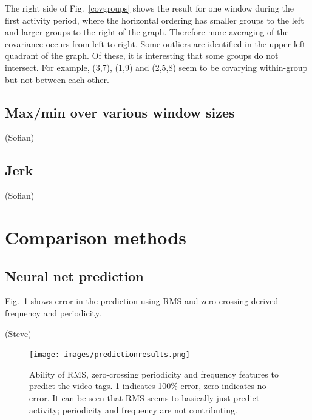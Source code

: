 \documentclass{article}
\begin{document}
The right side of Fig.~\ref{covgroups} shows the result for one window
during the first activity period, where the horizontal ordering has
smaller groups to the left and larger groups to the right of the
graph.
Therefore more averaging of the covariance occurs from left to right.
Some outliers are identified in the upper-left quadrant of the graph.
Of these, it is interesting that some groups do not intersect.
For example, (3,7), (1,9) and (2,5,8) seem to be covarying
within-group but not between each other.

\subsection{Max/min over various window sizes}

(Sofian)

\subsection{Jerk}

(Sofian)

\section{Comparison methods}

\subsection{Neural net prediction}

Fig.~\ref{fig:predresults} shows error in the prediction using RMS and
zero-crossing-derived frequency and periodicity.

(Steve)

\begin{figure}
\centerline{\texttt{[image: images/predictionresults.png]}}
\caption{Ability of RMS, zero-crossing periodicity and frequency
  features to predict the video tags.  1 indicates 100\% error, zero
  indicates no error.  It can be seen that RMS seems to basically just
  predict activity; periodicity and frequency are not contributing.}
\label{fig:predresults}
\end{figure}
\end{document}
